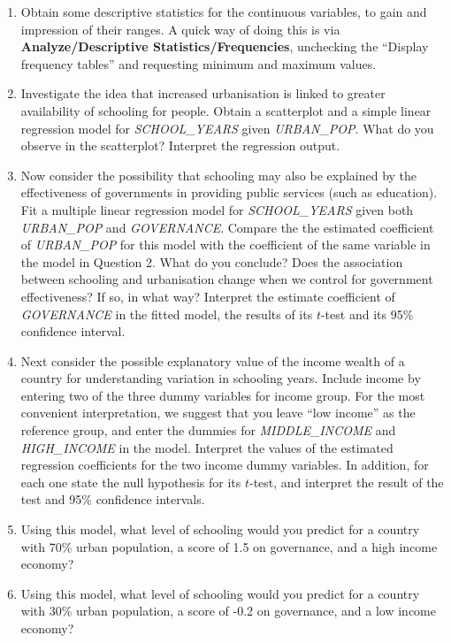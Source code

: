 \begin{enumerate}
\item
Obtain some descriptive statistics for the continuous variables, to gain
and impression of their ranges. A quick way of doing this is via
\textbf{Analyze/Descriptive Statistics/Frequencies}, unchecking the ``Display frequency tables''
and requesting minimum and maximum values.
\item
Investigate the idea that increased urbanisation is linked to greater availability of
schooling for people. Obtain a scatterplot and a simple linear
regression model for
\emph{SCHOOL\_YEARS} given \emph{URBAN\_POP}.
What do you observe in the scatterplot? Interpret the regression output.
\item
Now consider the possibility that schooling may also be explained by the effectiveness
of governments in providing public services (such as education). Fit a
multiple linear regression model for \emph{SCHOOL\_YEARS} given both
\emph{URBAN\_POP} and \emph{GOVERNANCE}.
Compare the the estimated coefficient of
\emph{URBAN\_POP} for this model with the coefficient of the same
variable in the model in Question 2.
What do you conclude? Does the
association between schooling and urbanisation change when we control for
government effectiveness? If so, in what way? Interpret the estimate coefficient of \emph{GOVERNANCE}
in the fitted model, the results of its $t$-test and its 95\% confidence interval.
\item
Next consider the possible explanatory value of the income wealth of a country
for understanding variation in schooling years. Include income by entering two
of the three dummy variables for income group. For the most convenient interpretation,
we suggest that you leave ``low income'' as the reference group, and enter the
dummies for \emph{MIDDLE\_INCOME} and \emph{HIGH\_INCOME} in the model.
Interpret the values of the estimated regression coefficients for the two income dummy variables. In
addition, for each one state the null hypothesis for
its $t$-test, and interpret the result of the test and 95\% confidence intervals.
\item
Using this model, what level of schooling would you predict for a country with 70\% urban population,
a score of 1.5 on governance, and a high income economy?
\item
Using this model, what level of schooling would you predict for a country with 30\% urban population,
a score of -0.2 on governance, and a low income economy?
\end{enumerate}

